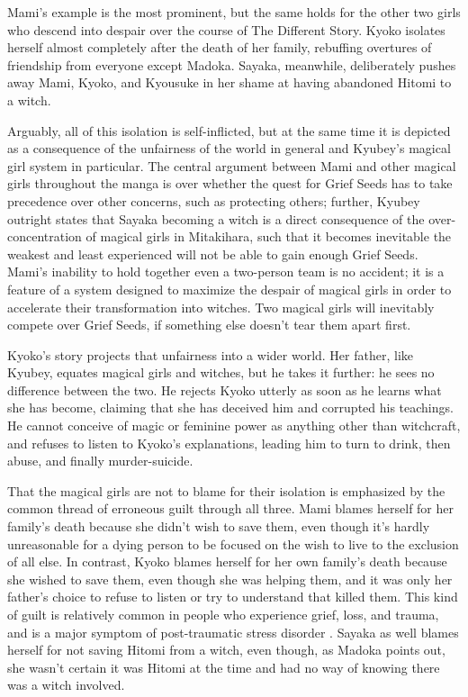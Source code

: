 Mami's example is the most prominent, but the same holds for the other two girls who descend into despair over the course of The Different Story. Kyoko isolates herself almost completely after the death of her family, rebuffing overtures of friendship from everyone except Madoka. Sayaka, meanwhile, deliberately pushes away Mami, Kyoko, and Kyousuke in her shame at having abandoned Hitomi to a witch.

Arguably, all of this isolation is self-inflicted, but at the same time it is depicted as a consequence of the unfairness of the world in general and Kyubey's magical girl system in particular. The central argument between Mami and other magical girls throughout the manga is over whether the quest for Grief Seeds has to take precedence over other concerns, such as protecting others; further, Kyubey outright states that Sayaka becoming a witch is a direct consequence of the over-concentration of magical girls in Mitakihara, such that it becomes inevitable the weakest and least experienced will not be able to gain enough Grief Seeds. Mami's inability to hold together even a two-person team is no accident; it is a feature of a system designed to maximize the despair of magical girls in order to accelerate their transformation into witches. Two magical girls will inevitably compete over Grief Seeds, if something else doesn't tear them apart first.

Kyoko's story projects that unfairness into a wider world. Her father, like Kyubey, equates magical girls and witches, but he takes it further: he sees no difference between the two. He rejects Kyoko utterly as soon as he learns what she has become, claiming that she has deceived him and corrupted his teachings. He cannot conceive of magic or feminine power as anything other than witchcraft, and refuses to listen to Kyoko's explanations, leading him to turn to drink, then abuse, and finally murder-suicide.

That the magical girls are not to blame for their isolation is emphasized by the common thread of erroneous guilt through all three. Mami blames herself for her family's death because she didn't wish to save them, even though it's hardly unreasonable for a dying person to be focused on the wish to live to the exclusion of all else. In contrast, Kyoko blames herself for her own family's death because she wished to save them, even though she was helping them, and it was only her father's choice to refuse to listen or try to understand that killed them. This kind of guilt is relatively common in people who experience grief, loss, and trauma, and is a major symptom of post-traumatic stress disorder \cite{ref106}. Sayaka as well blames herself for not saving Hitomi from a witch, even though, as Madoka points out, she wasn't certain it was Hitomi at the time and had no way of knowing there was a witch involved.

